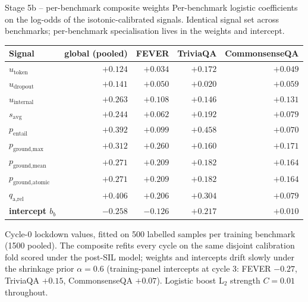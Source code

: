 \documentclass[10pt,aspectratio=169]{beamer}
\begin{document}
\begin{frame}{Stage 5b -- per-benchmark composite weights}
  \scriptsize
  Per-benchmark logistic coefficients on the log-odds of the isotonic-calibrated signals. Identical signal set across benchmarks; per-benchmark specialisation lives in the weights and intercept.

  \vspace{0.3em}
  \begin{tabular}{@{}lrrrr@{}}
    \toprule
    Signal & global (pooled) & FEVER & TriviaQA & CommonsenseQA \\
    \midrule
    $u_{\text{token}}$           & $+0.124$ & $+0.034$ & $+0.172$ & $+0.049$ \\
    $u_{\text{dropout}}$         & $+0.141$ & $+0.050$ & $+0.020$ & $+0.059$ \\
    $u_{\text{internal}}$        & $+0.263$ & $+0.108$ & $+0.146$ & $+0.131$ \\
    $s_{\text{avg}}$             & $+0.244$ & $+0.062$ & $+0.192$ & $+0.079$ \\
    $p_{\text{entail}}$          & $+0.392$ & $+0.099$ & $\mathbf{+0.458}$ & $+0.070$ \\
    $p_{\text{ground,max}}$      & $+0.312$ & $\mathbf{+0.260}$ & $+0.160$ & $+0.171$ \\
    $p_{\text{ground,mean}}$     & $+0.271$ & $+0.209$ & $+0.182$ & $+0.164$ \\
    $p_{\text{ground,atomic}}$   & $+0.271$ & $+0.209$ & $+0.182$ & $+0.164$ \\
    $q_{\text{a,rel}}$           & $+0.406$ & $+0.206$ & $+0.304$ & $+0.079$ \\
    \midrule
    \textbf{intercept $b_b$}     & $-0.258$ & $-0.126$ & $\mathbf{+0.217}$ & $+0.010$ \\
    \bottomrule
  \end{tabular}

  \vspace{0.3em}
  Cycle-0 lockdown values, fitted on 500 labelled samples per training benchmark (1500 pooled). The composite refits every cycle on the same disjoint calibration fold scored under the post-SIL model; weights and intercepts drift slowly under the shrinkage prior $\alpha=0.6$ (training-panel intercepts at cycle 3: FEVER $-0.27$, TriviaQA $+0.15$, CommonsenseQA $+0.07$). Logistic boost L$_2$ strength $C=0.01$ throughout.


\end{frame}
\end{document}
